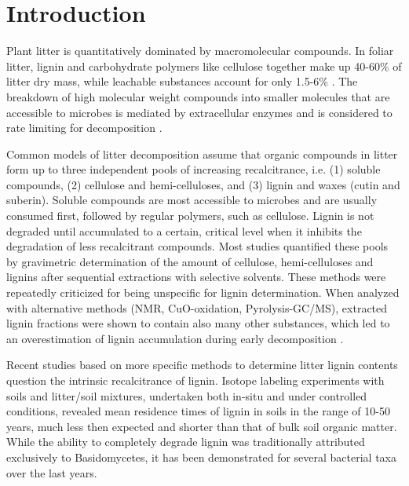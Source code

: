 \section*{Introduction}

Plant litter is quantitatively dominated by macromolecular compounds. In foliar litter, lignin and carbohydrate polymers like cellulose together make up 40-60\% of litter dry mass\cite{Berg2008}, while leachable substances account for only 1.5-6\% \cite{Don2005}. The breakdown of high molecular weight compounds into smaller molecules that are accessible to microbes is mediated by extracellular enzymes and is considered to rate limiting for decomposition \cite{Sinsabaugh2010}.

Common models of litter decomposition \cite{Berg1980, Couteaux1995, Moorhead2006, Adair2008} assume that organic compounds in litter form up to three independent pools of increasing recalcitrance, i.e. (1) soluble compounds, (2) cellulose and hemi-celluloses, and (3) lignin and waxes (cutin and suberin). Soluble compounds are most accessible to microbes and are usually consumed first, followed by regular polymers, such as cellulose. Lignin is not degraded until accumulated to a certain, critical level when it inhibits the degradation of less recalcitrant compounds. Most studies quantified these pools by gravimetric determination of the amount of cellulose, hemi-celluloses and lignins after sequential extractions with selective solvents. These methods were repeatedly criticized for being unspecific for lignin determination\cite{Hatfield2005}. When analyzed with alternative methods (NMR, CuO-oxidation, Pyrolysis-GC/MS), extracted lignin fractions were shown to contain also many other substances\cite{
Preston1997}, which led to an overestimation of lignin accumulation during early decomposition \cite{Klotzbucher2011a}.

Recent studies based on more specific methods to determine litter lignin contents question the intrinsic recalcitrance of lignin. Isotope labeling experiments with soils and litter/soil mixtures, undertaken both in-situ and under controlled conditions,  revealed mean residence times of lignin in soils in the range of 10-50 years, much less then expected and shorter than that of bulk soil organic matter\cite{Amelung2008, Thevenot2010a, Bol2009}. While the ability to completely degrade lignin was traditionally  attributed exclusively to Basidomycetes, it has been demonstrated for several bacterial taxa over the last years\cite{Bugg2011}.

